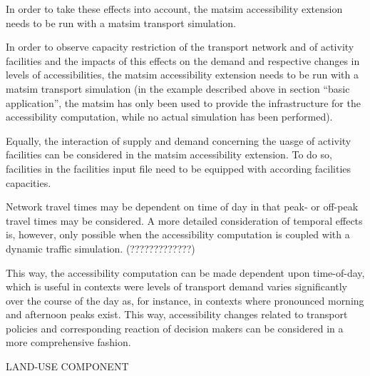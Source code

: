 In order to take these effects into account, the \gls{matsim} accessibility extension 
needs to be run with a \gls{matsim} transport simulation.

In order to observe capacity restriction of the transport network and of activity facilities and the impacts of 
this effects on the demand and respective changes in levels of accessibilities, the \gls{matsim} accessibility 
extension needs to be run with a \gls{matsim} transport simulation (in the example described above in section ``basic 
application'', the \gls{matsim} has only been used to provide the infrastructure for the accessibility computation, 
while no actual simulation has been performed).

Equally, the interaction of supply and demand concerning the uasge of activity facilities can be considered in 
the \gls{matsim} accessibility extension. To do so, facilities in the facilities input file need to be equipped 
with according facilities capacities.

Network travel times may be dependent on time of day in that \eg peak- or off-peak travel times may be 
considered. A more detailed consideration of temporal effects is, however, only possible when the accessibility 
computation is coupled with a dynamic traffic simulation. (?????????????)

This way, the accessibility computation can be made dependent upon time-of-day, which is useful in contexts were 
levels of transport demand varies significantly over the course of the day as, for instance, in contexts where 
pronounced morning and afternoon peaks exist. This way, accessibility changes related to transport policies and 
corresponding reaction of decision makers can be considered in a more comprehensive fashion.



LAND-USE COMPONENT

